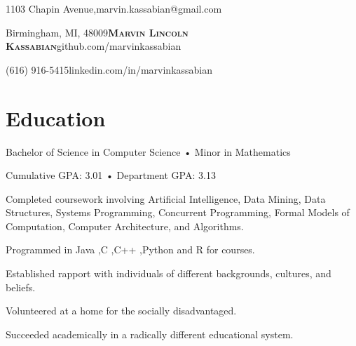\documentclass{playground}
\begin{document}
	{1103 Chapin Avenue,}\hfill{marvin.kassabian@gmail.com}
	
	{Birmingham, MI, 48009}\hfill{\Large{\textbf{\scshape{Marvin Lincoln Kassabian}}}}\hfill{github.com/marvinkassabian}

	{(616) 916-5415}\hfill{linkedin.com/in/marvinkassabian}


	\section{Education}
{Bachelor of Science in Computer Science • Minor in Mathematics}

{Cumulative GPA: 3.01 • Department GPA: 3.13}
			\resumesublistbegin
				\item Completed coursework involving Artificial Intelligence, Data Mining, Data Structures, Systems Programming,
Concurrent Programming, Formal Models of Computation, Computer Architecture, and Algorithms.
				\item Programmed in Java ,C ,C++ ,Python and R for courses.
			\resumesublistend
			\resumesublistbegin
				\item Established rapport with individuals of different backgrounds, cultures, and beliefs.
				\item Volunteered at a home for the socially disadvantaged.
				\item Succeeded academically in a radically different educational system.
			\resumesublistend
\end{document}
